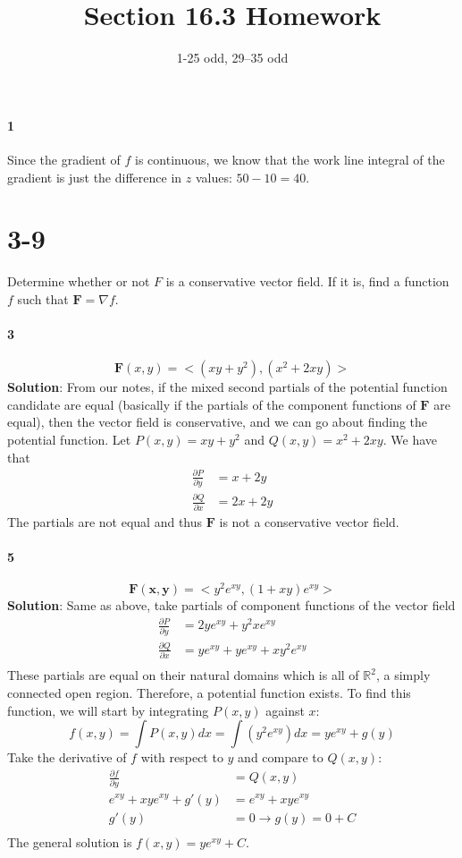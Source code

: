 \documentclass{article}
\title{Section 16.3 Homework}
\author{1-25 odd, 29--35 odd}
\date{}
\newcommand{\parf}[2]{\frac{\partial #1}{\partial #2}}
\begin{document}
    \maketitle

    \paragraph{1} Since the gradient of $f$ is continuous, we know that the work line integral of the gradient is just the difference in $z$ values: $50-10=40$.

    \section*{3-9} Determine whether or not $F$ is a conservative vector field.
    If it is, find a function $f$ such that $\mathbf{F} = \nabla f$.

    \paragraph{3}
    \[  \mathbf{F}(x,y) = <(xy+y^2), (x^2+2xy)> \]
    \textbf{Solution}: From our notes, if the mixed second partials of the potential function candidate are equal
    (basically if the partials of the component functions of $\mathbf{F}$ are equal), then the vector field is conservative, and
    we can go about finding the potential function.
    Let $P(x,y) = xy+y^2$ and $Q(x,y) = x^2+2xy$.
    We have that
    \begin{align*}
        \parf{P}{y} &= x + 2y \\
        \parf{Q}{x} &= 2x + 2y
    \end{align*}
    The partials are not equal and thus $\mathbf{F}$ is not a conservative vector field.


    \paragraph{5}
    \[\mathbf{F(x,y)}=<y^{2}e^{xy}, (1+xy)e^{xy}>\]
    \textbf{Solution}: Same as above, take partials of component functions of the vector field
    \begin{align*}
        \parf{P}{y} &= 2ye^{xy} + y^{2}xe^{xy} \\
        \parf{Q}{x} &= ye^{xy} + ye^{xy} + xy^{2}e^{xy}\\
    \end{align*}
    These partials are equal on their natural domains which is all of $\mathbb{R}^2$, a simply connected open region.
    Therefore, a potential function exists.
    To find this function, we will start by integrating $P(x,y)$ against $x$:
    \[f(x,y)=\int P(x,y)dx = \int (y^{2}e^{xy}) dx = ye^{xy} + g(y)\]
    Take the derivative of $f$ with respect to $y$ and compare to $Q(x,y)$:
    \begin{align*}
        \parf{f}{y} &= Q(x,y) \\
        e^{xy} + xye^{xy} + g'(y) &= e^{xy} + xye^{xy} \\
        g'(y) &= 0 \rightarrow g(y) = 0 + C \\
    \end{align*}
    The general solution is $f(x,y) = ye^{xy} + C$.
\end{document}
